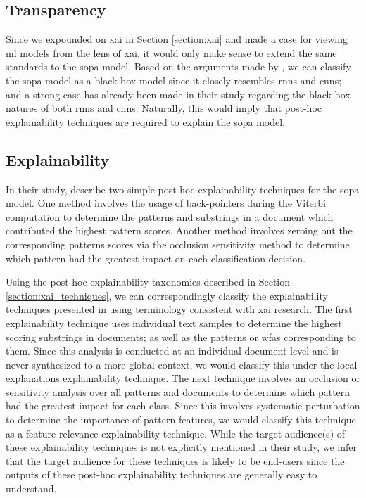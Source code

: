 \subsection{Transparency}

\label{section:sopa_transparency}

Since we expounded on \ac{xai} in Section \ref{section:xai} and made a case for
viewing \ac{ml} models from the lens of \ac{xai}, it would only make sense to extend the
same standards to the \ac{sopa} model. Based on the arguments made by
\citet{arrieta2020explainable}, we can classify the \ac{sopa} model as a black-box
model since it closely resembles \ac{rnn}s and \ac{cnn}s; and a strong case has already
been made in their study regarding the black-box natures of both \ac{rnn}s and \ac{cnn}s.
Naturally, this would imply that post-hoc explainability techniques are required to
explain the \ac{sopa} model.

\subsection{Explainability}

\label{section:sopa_post_hoc}

In their study, \citet[Page 7, Section 7]{schwartz2018sopa} describe two simple
post-hoc explainability techniques for the \ac{sopa} model. One method involves the
usage of back-pointers during the Viterbi computation to determine the patterns
and substrings in a document which contributed the highest pattern scores.
Another method involves zeroing out the corresponding patterns scores via the
occlusion sensitivity method to determine which pattern had the greatest impact
on each classification decision.

Using the post-hoc explainability taxonomies described in Section
\ref{section:xai_techniques}, we can correspondingly classify the explainability
techniques presented in \citet{schwartz2018sopa} using terminology consistent with
\ac{xai} research. The first explainability technique uses individual text samples to
determine the highest scoring substrings in documents; as well as the patterns
or \ac{wfas} corresponding to them. Since this analysis is conducted at an individual
document level and is never synthesized to a more global context, we would
classify this under the local explanations explainability technique. The next
technique involves an occlusion or sensitivity analysis over all patterns and
documents to determine which pattern had the greatest impact for each class.
Since this involves systematic perturbation to determine the importance of
pattern features, we would classify this technique as a feature relevance
explainability technique. While the target audience(s) of these
explainability techniques is not explicitly mentioned in their study, we infer that
the target audience for these techniques is likely to be end-users since the
outputs of these post-hoc explainability techniques are generally easy to understand.

